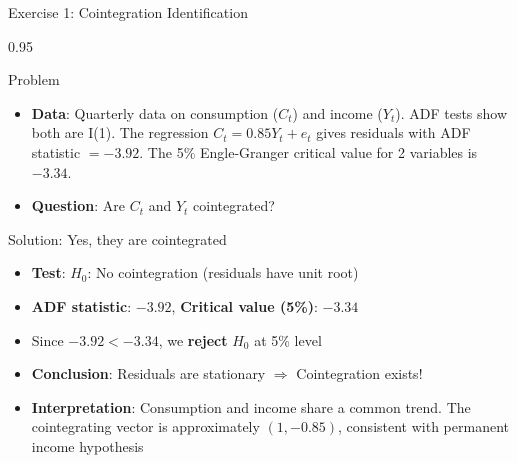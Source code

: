 \documentclass[9pt, aspectratio=169, t]{beamer}
\begin{document}
\begin{frame}{Exercise 1: Cointegration Identification}
    \begin{cminipage}{0.95\textwidth}
    \begin{alertblock}{Problem}
        \begin{itemize}\setlength{\itemsep}{0pt}
            \item \textbf{Data}: Quarterly data on consumption ($C_t$) and income ($Y_t$). ADF tests show both are I(1). The regression $C_t = 0.85 Y_t + e_t$ gives residuals with ADF statistic $= -3.92$. The 5\% Engle-Granger critical value for 2 variables is $-3.34$.
            \item \textbf{Question}: Are $C_t$ and $Y_t$ cointegrated?
        \end{itemize}
    \end{alertblock}

    \vspace{0.2cm}
    \begin{exampleblock}{Solution: Yes, they are cointegrated}
        \begin{itemize}\setlength{\itemsep}{0pt}
            \item \textbf{Test}: $H_0$: No cointegration (residuals have unit root)
            \item \textbf{ADF statistic}: $-3.92$, \textbf{Critical value (5\%)}: $-3.34$
            \item Since $-3.92 < -3.34$, we \textbf{reject} $H_0$ at 5\% level
            \item \textbf{Conclusion}: Residuals are stationary $\Rightarrow$ Cointegration exists!
            \item \textbf{Interpretation}: Consumption and income share a common trend. The cointegrating vector is approximately $(1, -0.85)$, consistent with permanent income hypothesis
        \end{itemize}
    \end{exampleblock}
    \end{cminipage}
\end{frame}
\end{document}
